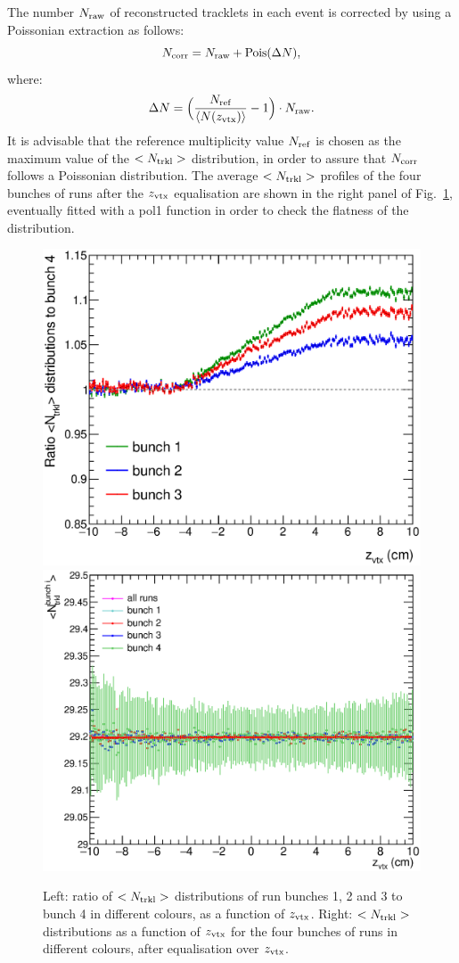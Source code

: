 The number $N_{\rm raw}$ of reconstructed tracklets in each event
is corrected by using a Poissonian extraction as follows:
\begin{equation} 
\label{eq:NtrklCorr}
N_{\rm corr} = N_{\rm raw} + {\rm Pois}(\Delta N),
\end{equation}
where:
\begin{equation} 
\label{eq:NtrklCorr}
\Delta N = \Big (\frac{N_{\rm ref}}{\langle N(z_{\rm vtx}) \rangle} -1 \Big ) \cdot N_{\rm raw}.
\end{equation}
 It is advisable that the reference multiplicity value $N_{\rm ref}$ is chosen as the
 maximum value of the $<N_{\rm trkl}>$ distribution, in order to assure
 that $N_{\rm corr}$ follows a Poissonian distribution. 
The average $<N_{\rm trkl}>$ profiles of the four bunches of runs 
after the $z_{\rm vtx}$ equalisation are shown in the right panel of 
Fig.~\ref{fig:FourBunches}, eventually fitted with a pol1 function in order
to check the flatness of the distribution. 

\begin{figure}[h]
\centering
 \includegraphics[width=.49\textwidth]{FigCap6/UncorrNtrklProfileDataRatio.eps}
 \includegraphics[width=.49\textwidth]{FigCap6/NtrkProfilesDataAfterZVxtEqual.eps}
 \caption{Left: ratio of $<N_{\rm trkl}>$ distributions of run bunches 1, 2 and 3 to bunch 4 in different colours, as a function of $z_{\rm vtx}$. Right: $<N_{\rm trkl}>$ distributions as a function of $z_{\rm vtx}$ for the four bunches of runs in different colours, after equalisation over $z_{\rm vtx}$.}
 \label{fig:FourBunches}
\end{figure}

